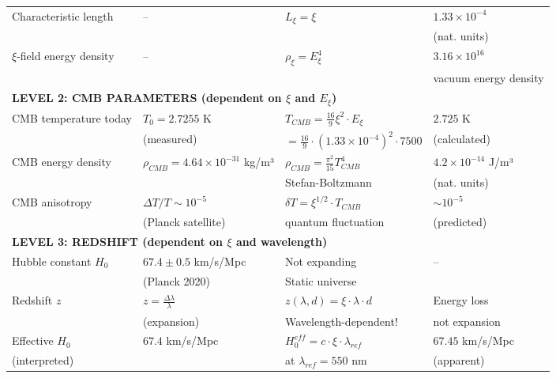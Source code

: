 \documentclass[12pt,a4paper]{article}
\begin{document}
\begin{longtable}{p{5cm}p{4cm}p{3.5cm}p{3.5cm}}
	Characteristic length & -- & $L_\xi = \xi$ & $1.33 \times 10^{-4}$ \\
	& & & (nat. units) \\[0.3em]
	
	$\xi$-field energy density & -- & $\rho_\xi = E_\xi^4$ & $3.16 \times 10^{16}$ \\
	& & & vacuum energy density \\[0.3em]
	
	\midrule
	\multicolumn{4}{l}{\textbf{LEVEL 2: CMB PARAMETERS (dependent on $\xi$ and $E_\xi$)}} \\
	\midrule
	
	CMB temperature today & $T_0 = 2.7255$ K & $T_{CMB} = \frac{16}{9} \xi^2 \cdot E_\xi$ & $2.725$ K \\
	& (measured) & $= \frac{16}{9} \cdot (1.33 \times 10^{-4})^2 \cdot 7500$ & (calculated) \\[0.3em]
	
	CMB energy density & $\rho_{CMB} = 4.64 \times 10^{-31}$ kg/m³ & $\rho_{CMB} = \frac{\pi^2}{15} T_{CMB}^4$ & $4.2 \times 10^{-14}$ J/m³ \\
	& & Stefan-Boltzmann & (nat. units) \\[0.3em]
	
	CMB anisotropy & $\Delta T/T \sim 10^{-5}$ & $\delta T = \xi^{1/2} \cdot T_{CMB}$ & $\sim 10^{-5}$ \\
	& (Planck satellite) & quantum fluctuation & (predicted) \\[0.3em]
	
	\midrule
	\multicolumn{4}{l}{\textbf{LEVEL 3: REDSHIFT (dependent on $\xi$ and wavelength)}} \\
	\midrule
	
	Hubble constant $H_0$ & $67.4 \pm 0.5$ km/s/Mpc & Not expanding & -- \\
	& (Planck 2020) & Static universe & \\[0.3em]
	
	Redshift $z$ & $z = \frac{\Delta\lambda}{\lambda}$ & $z(\lambda, d) = \xi \cdot \lambda \cdot d$ & Energy loss \\
	& (expansion) & Wavelength-dependent! & not expansion \\[0.3em]
	
	Effective $H_0$ & $67.4$ km/s/Mpc & $H_0^{eff} = c \cdot \xi \cdot \lambda_{ref}$ & $67.45$ km/s/Mpc \\
	(interpreted) & & at $\lambda_{ref} = 550$ nm & (apparent) \\[0.3em]
	

\end{longtable}
\end{document}
